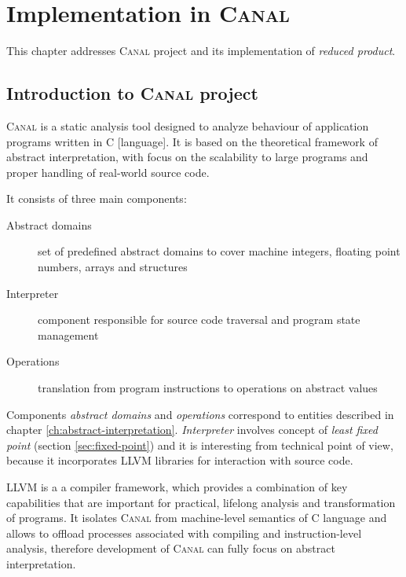 \documentclass[12pt,oneside]{fithesis2}
\theoremstyle{definition}
\begin{document}
\chapter{Implementation in \textsc{Canal}}

This chapter addresses \textsc{Canal} project and its implementation of \textit{reduced product}.

\section{Introduction to \textsc{Canal} project}

\textsc{Canal} is a static analysis tool designed to analyze behaviour of
application programs written in C [language]. It is based on the theoretical
framework of abstract interpretation, with focus on the scalability to
large programs and proper handling of real-world source code. \cite{Canal}

It consists of three main components:

\begin{description}
  \item[Abstract domains] set of predefined abstract domains to cover machine integers, floating point numbers, arrays and structures
  \item[Interpreter] component responsible for source code traversal and program state management
  \item[Operations] translation from program instructions to operations on abstract values
\end{description}

Components \textit{abstract domains} and \textit{operations} correspond to entities described in chapter \ref{ch:abstract-interpretation}. \textit{Interpreter} involves concept of \textit{least fixed point} (section \ref{sec:fixed-point}) and it is interesting from technical point of view, because it incorporates LLVM libraries for interaction with source code.

LLVM is a a compiler framework, which provides a combination of key capabilities that are important for practical, lifelong analysis and
transformation of programs. \cite{llvm} It isolates \textsc{Canal} from machine-level semantics of C language and allows to offload processes associated with compiling and instruction-level analysis, therefore development of \textsc{Canal} can fully focus on abstract interpretation.
\end{document}
